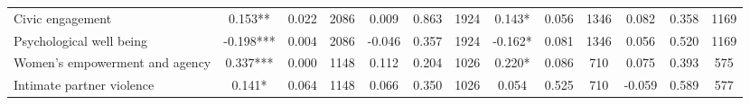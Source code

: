 \begin{tabular}{l*{12}{c}}
 Civic engagement &        0.153** &        0.022 & 2086    &        0.009 &        0.863 & 1924    &        0.143* &        0.056 & 1346 &        0.082 &        0.358 & 1169 \\ 

 Psychological well being &       -0.198*** &        0.004 & 2086    &       -0.046 &        0.357 & 1924    &       -0.162* &        0.081 & 1346 &        0.056 &        0.520 & 1169 \\ 

 Women's empowerment and agency &        0.337*** &        0.000 & 1148    &        0.112 &        0.204 & 1026    &        0.220* &        0.086 & 710 &        0.075 &        0.393 & 575 \\ 

 Intimate partner violence &        0.141* &        0.064 & 1148    &        0.066 &        0.350 & 1026    &        0.054 &        0.525 & 710 &       -0.059 &        0.589 & 577 \\ 

\hline \end{tabular}
